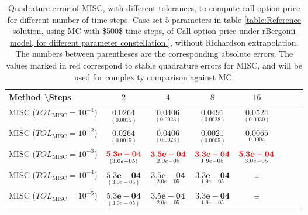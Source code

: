 \begin{table}[h!]
	\centering
	\begin{tabular}{l*{6}{c}r}
		Method \textbackslash  Steps            & $2$ & $4$ & $8$ & $16$  \\
		\hline
		MISC ($TOL_{\text{MISC}}=10^{-1}$)  & $\underset{(  0.0015
			)}{\mathbf{     0.0264}}$& $\underset{(    0.0023
			)}{\mathbf{         0.0406}}$& $\underset{(    0.0028)}{\mathbf{      0.0491
		}}$  & $\underset{(      
			0.0030)}{\mathbf{     0.0524
		}}$   \\
		MISC ($TOL_{\text{MISC}}=10^{-2}$)  & $\underset{(  0.0015
			)}{\mathbf{     0.0264}}$ &$\underset{(    0.0023
			)}{\mathbf{         0.0406}}$ & $\underset{(0.0005)}{\mathbf{    0.0021
		}}$ &  $\underset{0.0004}{\mathbf{    0.0065}}$  \\
		MISC ($TOL_{\text{MISC}}=10^{-3}$)  & $\underset{(      3.0e-05)}{\mathbf{    {\color{red}5.3e-04}}}$ & $\underset{2.0e-05}{\mathbf{{\color{red}3.5e-04}}}$& $\underset{1.9e-05}{\mathbf{{\color{red}3.3e-04}}}$ &  $\underset{3.0e-05}{\mathbf{{\color{red}5.3e-04}}}$  \\
		MISC ($TOL_{\text{MISC}}=10^{-4}$)  & $\underset{(      3.0e-05)}{\mathbf{    5.3e-04}}$ & $\underset{2.0e-05}{\mathbf{3.5e-04}}$& $\underset{1.9e-05}{\mathbf{3.3e-04}}$ & $\underset{-}{\mathbf{-}}$  \\
		
		MISC ($TOL_{\text{MISC}}=10^{-5}$)  & $\underset{(      3.0e-05)}{\mathbf{    5.3e-04}}$ & $\underset{2.0e-05}{\mathbf{3.5e-04}}$& $\underset{1.9e-05}{\mathbf{3.3e-04}}$& $\underset{-}{\mathbf{-}}$  \\
		
		\hline
		
	\end{tabular}
	\caption{Quadrature error of MISC, with  different tolerances,  to compute call option price  for different number of time steps. Case  set $5$ parameters in table \ref{table:Reference solution, using MC with $500$ time steps, of Call option price under rBergomi model, for different parameter constellation.}, without Richardson extrapolation. The numbers between parentheses are the corresponding absolute errors. The values marked in red correspond to stable quadrature errors for MISC, and will be used for complexity comparison against MC.}
	\label{Quadrature error of MISC to compute Call option price of the different tolerances for different number of time steps. Case  set $5$ parameters, without Richardson extrapolation. The numbers between parentheses are the corresponding absolute errors.}
\end{table}